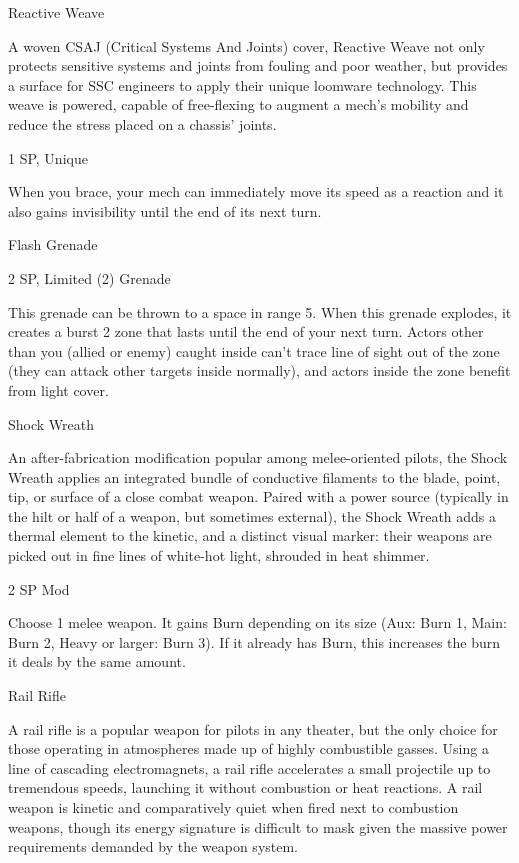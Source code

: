 \begin{mech}
Reactive Weave

A woven CSAJ (Critical Systems And Joints) cover, Reactive Weave not only protects sensitive systems and joints from fouling and poor weather, but provides a surface for SSC engineers to apply their unique loomware technology. This weave is powered, capable of free-flexing to augment a mech's mobility and reduce the stress placed on a chassis' joints.

1 SP, Unique

When you brace, your mech can immediately move its speed as a reaction and it also gains invisibility until the end of its next turn.


Flash Grenade

2 SP, Limited (2)
Grenade

This grenade can be thrown to a space in range 5. When this grenade explodes, it creates a burst 2 zone that lasts until the end of your next turn. Actors other than you (allied or enemy) caught inside can't trace line of sight out of the zone (they can attack other targets inside normally), and actors inside the zone benefit from light cover.


Shock Wreath

An after-fabrication modification popular among melee-oriented pilots, the Shock Wreath applies an integrated bundle of conductive filaments to the blade, point, tip, or surface of a close combat weapon. Paired with a power source (typically in the hilt or half of a weapon, but sometimes external), the Shock Wreath adds a thermal element to the kinetic, and a distinct visual marker: their weapons are picked out in fine lines of white-hot light, shrouded in heat shimmer.

2 SP
Mod

Choose 1 melee weapon. It gains Burn depending on its size (Aux: Burn 1, Main: Burn 2, Heavy
or larger: Burn 3). If it already has Burn, this increases the burn it deals by the same amount.


Rail Rifle

A rail rifle is a popular weapon for pilots in any theater, but the only choice for those operating in atmospheres made up of highly combustible gasses. Using a line of cascading electromagnets, a rail rifle accelerates a small projectile up to tremendous speeds, launching it without combustion or heat reactions. A rail weapon is kinetic and comparatively quiet when fired next to combustion weapons, though its energy signature is difficult to mask given the massive power requirements demanded by the weapon system.


\end{mech}
